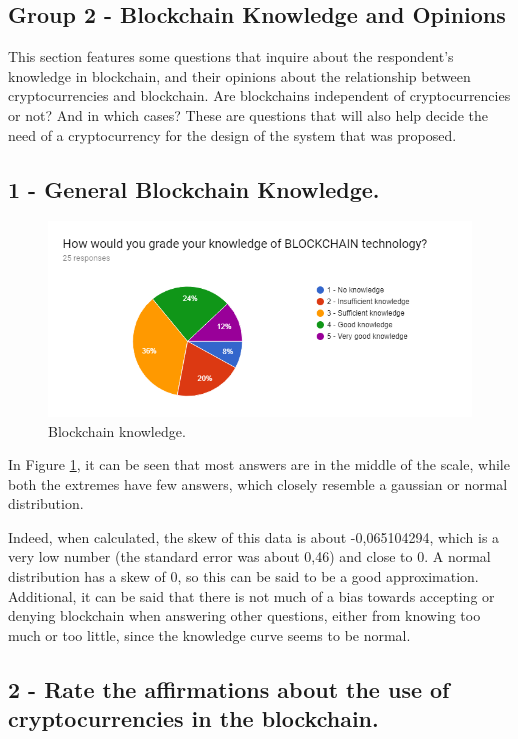 
\subsection{Group 2 - Blockchain Knowledge and Opinions}

This section features some questions that inquire about the respondent's knowledge in blockchain, and their opinions about the relationship between cryptocurrencies and blockchain. Are blockchains independent of cryptocurrencies or not? And in which cases? These are questions that will also help decide the need of a cryptocurrency for the design of the system that was proposed.

\subsection*{1 - General Blockchain Knowledge.}
 \begin{figure}[h]
\centering
\includegraphics[scale=0.65]{media/blockchain_knowledge.png}
\caption["Blockchain knowledge."]{Blockchain knowledge.}
\label{fig:blockchain_knowledge}
\end{figure}

In Figure \ref{fig:blockchain_knowledge}, it can be seen that most answers are in the middle of the scale, while both the extremes have few answers, which closely resemble a gaussian or normal distribution. 

Indeed, when calculated, the skew of this data is about -0,065104294, which is a very low number (the standard error was about 0,46) and close to 0. A normal distribution has a skew of 0, so this can be said to be a good approximation. Additional, it can be said that there is not much of a bias towards accepting or denying blockchain when answering other questions, either from knowing too much or too little, since the knowledge curve seems to be normal.
 
\subsection*{2 - Rate the affirmations about the use of cryptocurrencies in the blockchain.}


